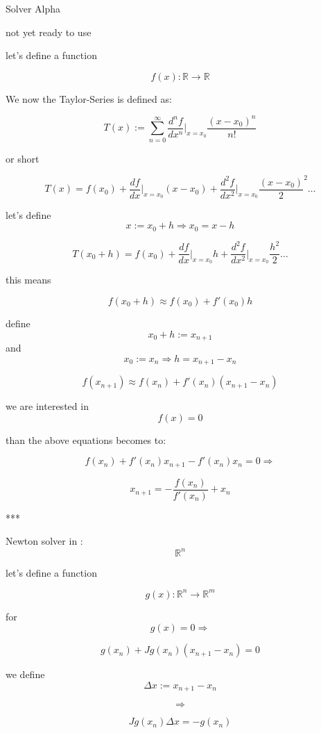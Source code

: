 Solver Alpha

not yet ready to use




let's define a function

$$f(x) : \mathbb{R} \rightarrow \mathbb{R}$$

We now the Taylor-Series is defined as:

$$ T(x) := \sum_{n=0}^{\infty} \frac{d^nf}{dx^n} \vert_{x=x_0}^{} \frac{(x-x_0)^n}{n!}$$

or short

$$T(x) = f(x_0)+\frac{df}{dx}\vert_{x=x_0}^{} (x-x_0) + \frac{d^2f}{dx^2}\vert_{x=x_0}^{} \frac{(x-x_0)}{2}^2 \dots$$

let's define $$x := x_0 + h \Rightarrow x_0 = x-h$$


$$T(x_0+h) = f(x_0)+\frac{df}{dx}\vert_{x=x_0}^{} h + \frac{d^2f}{dx^2}\vert_{x=x_0}^{} \frac{h^2}{2} \dots$$

this means

$$f(x_0+h) \approx f(x_0)+ f'(x_0)h$$

define  $$x_0+h := x_{n+1}$$ and $$x_0 := x_n \Rightarrow h= x_{n+1}-x_n$$

$$f(x_{n+1}) \approx f(x_n)+ f'(x_n) (x_{n+1}-x_n)$$

we are interested in $$f(x)=0$$ 

than the above equations becomes to:

$$f(x_n)+ f'(x_n)x_{n+1} -f'(x_n)x_n = 0 \Rightarrow$$

$$x_{n+1}  = - \frac{f(x_n)}{f'(x_n)} + x_n$$

***

Newton solver in : $$\mathbb{R}^n$$

let's define a function

$$g(x) : \mathbb{R}^n \rightarrow \mathbb{R}^m$$

for $$g(x)=0 \Rightarrow$$

$$g(x_n)+ Jg(x_n) (x_{n+1}-x_n) = 0$$

we define $$\Delta x := x_{n+1}-x_n$$

$$\Rightarrow$$

$$Jg(x_n)\Delta x = -g(x_n)$$

